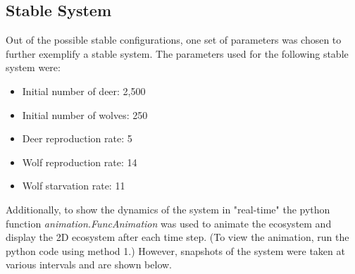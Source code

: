 \documentclass[a4paper,12pt]{article}
\begin{document}
\subsection{Stable System}
\indent
\indent Out of the possible stable configurations, one set of parameters was chosen to further exemplify a stable system.  The parameters used for the following 
stable system were:
\begin{itemize}
  \item{Initial number of deer: 2,500}
  \item{Initial number of wolves: 250}
  \item{Deer reproduction rate: 5}
  \item{Wolf reproduction rate: 14}
  \item{Wolf starvation rate: 11}
  \end{itemize}
Additionally, to show the dynamics of the system in "real-time" the python function \textit{
animation.FuncAnimation} was used to animate the ecosystem and display the 2D ecosystem after each time step.  (To view the animation, run the python code using 
method 1.)  However, snapshots of the system were taken at various intervals and are shown below.
\end{document}
